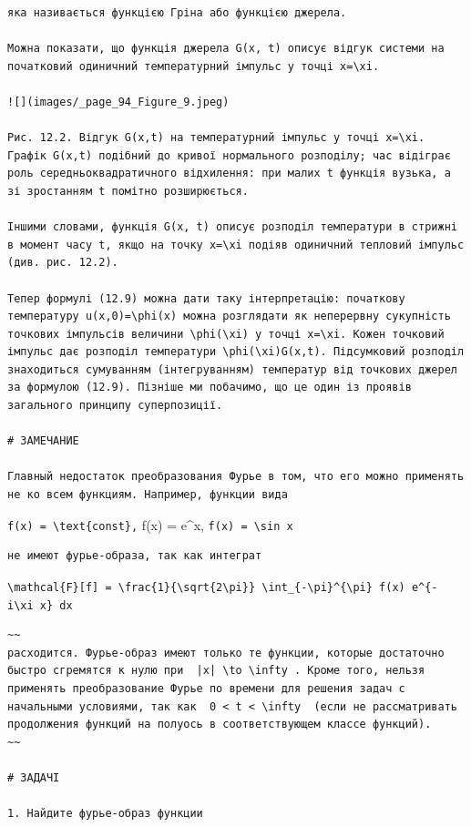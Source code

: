\documentclass[
  ukrainian,
]{article}
\begin{document}
\begin{verbatim}
яка називається функцією Гріна або функцією джерела.

Можна показати, що функція джерела G(x, t) описує відгук системи на початковий одиничний температурний імпульс у точці x=\xi.

![](images/_page_94_Figure_9.jpeg)

Рис. 12.2. Відгук G(x,t) на температурний імпульс у точці x=\xi. Графік G(x,t) подібний до кривої нормального розподілу; час відіграє роль середньоквадратичного відхилення: при малих t функція вузька, а зі зростанням t помітно розширюється.

Іншими словами, функція G(x, t) описує розподіл температури в стрижні в момент часу t, якщо на точку x=\xi подіяв одиничний тепловий імпульс (див. рис. 12.2).

Тепер формулі (12.9) можна дати таку інтерпретацію: початкову температуру u(x,0)=\phi(x) можна розглядати як неперервну сукупність точкових імпульсів величини \phi(\xi) у точці x=\xi. Кожен точковий імпульс дає розподіл температури \phi(\xi)G(x,t). Підсумковий розподіл знаходиться сумуванням (інтегруванням) температур від точкових джерел за формулою (12.9). Пізніше ми побачимо, що це один із проявів загального принципу суперпозиції.

# ЗАМЕЧАНИЕ

Главный недостаток преобразования Фурье в том, что его можно применять не ко всем функциям. Например, функции вида
\end{verbatim}

\texttt{f(x)\ =\ \textbackslash{}text\{const\},} f(x) = e\^{}x,
\texttt{f(x)\ =\ \textbackslash{}sin\ x}

\begin{verbatim}
не имеют фурье-образа, так как интеграт
\end{verbatim}

\texttt{\textbackslash{}mathcal\{F\}{[}f{]}\ =\ \textbackslash{}frac\{1\}\{\textbackslash{}sqrt\{2\textbackslash{}pi\}\}\ \textbackslash{}int\_\{-\textbackslash{}pi\}\^{}\{\textbackslash{}pi\}\ f(x)\ e\^{}\{-i\textbackslash{}xi\ x\}\ dx}

\begin{verbatim}
~~
расходится. Фурье-образ имеют только те функции, которые достаточно быстро сгремятся к нулю при  |x| \to \infty . Кроме того, нельзя применять преобразование Фурье по времени для решения задач с начальными условиями, так как  0 < t < \infty  (если не рассматривать продолжения функций на полуось в соответствующем классе функций).
~~

# ЗАДАЧІ

1. Найдите фурье-образ функции
\end{verbatim}
\end{document}
